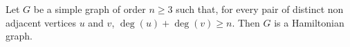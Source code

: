 \documentclass{article}
\begin{document}
Let $G$ be a simple graph of order $n\ge 3$ such that, for every pair of distinct non adjacent vertices $u$ and $v$, $\deg(u)+\deg(v)\ge n$.
Then $G$ is a Hamiltonian graph.
\end{document}
